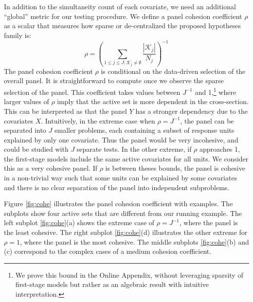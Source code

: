 \documentclass[11pt]{article}
\begin{document}
In addition to the simultaneity count of each covariate, we need an additional ``global'' metric for our testing procedure. We define a panel cohesion coefficient $\rho$ as a scalar that measures how sparse or de-centralized the proposed hypotheses family is:
\begin{equation}
	\rho = \left(\sum_{1\leq j\leq J:\mathcal{K}_j\neq\emptyset}\frac{|\mathcal{K}_j|}{N_j}   \right)^{-1}
\end{equation}
The panel cohesion coefficient $\rho$ is conditional on the data-driven selection of the overall panel. It is straightforward to compute once we observe the sparse selection of the panel. This coefficient takes values between $J^{-1}$ and 1,\footnote{We prove this bound in the Online Appendix, without leveraging sparsity of first-stage models but rather as an algebraic result with intuitive interpretation.} where larger values of $\rho$ imply that the active set is more dependent in the cross-section. This can be interpreted as that the panel $Y$ has a stronger dependency due to the covariates $X$. Intuitively, in the extreme case when $\rho=J^{-1}$, the panel can be separated into $J$ smaller problems, each containing a subset of response units explained by only one covariate. Thus the panel would be very incohesive, and could be studied with $J$ separate tests. In the other extreme, if $\rho $ approaches 1, the first-stage models include the same active covariates for all units. We consider this as a very cohesive panel. If $\rho$ is between theses bounds, the panel is cohesive in a non-trivial way such that some units can be explained by some covariates and there is no clear separation of the panel into independent subproblems. 

Figure \ref{fig:cohe} illustrates the panel cohesion coefficient with examples. The subplots show four active sets that are different from our running example. The left subplot \ref{fig:cohe}(a) shows the extreme case of $\rho=J^{-1}$, where the panel is the least cohesive. The right subplot \ref{fig:cohe}(d) illustrates the other extreme for $\rho=1$, where the panel is the most cohesive. The middle subplots \ref{fig:cohe}(b) and (c) correspond to the complex cases of a medium cohesion coefficient. 
\end{document}
